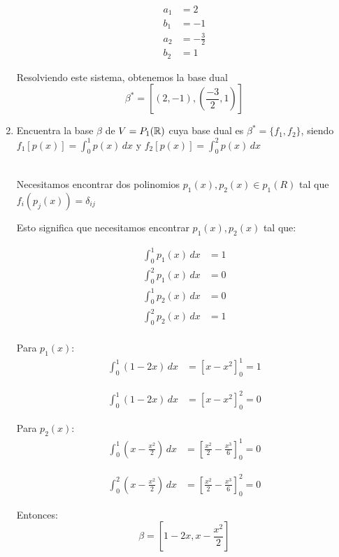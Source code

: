 \begin{enumerate}
    \begin{align*}
        a_{1} & = 2 \\
        b_{1} & = -1 \\ 
        a_{2} & = -\frac{3}{2} \\ 
        b_{2} & = 1
    \end{align*}

    Resolviendo este sistema, obtenemos la base dual 
    \begin{equation*}
        \beta^{*} = \left[ (2,-1), \left( \frac{-3}{2} , 1 \right) \right]
    \end{equation*}

    \item Encuentra la base $\beta$ de $V = P_{1} (\mathbb{R})$ cuya base dual es
          $\beta^{*} = \{ f_{1},f_{2} \}$, siendo 
          $f_{1} \left[ p(x) \right] = \int_{0}^{1} p(x) \, dx$
          y $f_{2} \left[ p(x) \right] = \int_{0}^{2} p(x) \, dx$ 

    \noindent \solucion \\

    Necesitamos encontrar dos polinomios $p_{1}(x), p_{2}(x) \in p_{1}(R)$ tal que 
    $f_{i}(p_{j}(x)) = \delta_{ij}$

    Esto significa que necesitamos encontrar $p_{1}(x),p_{2}(x)$ tal que:

    \begin{align*}
        \int_{0}^{1} p_1(x) \, dx &= 1 \\
        \int_{0}^{2} p_1(x) \, dx &= 0 \\
        \int_{0}^{1} p_2(x) \, dx &= 0 \\
        \int_{0}^{2} p_2(x) \, dx &= 1 \\
    \end{align*}

    Para $p_{1}(x)$:
    \begin{align*}
        \int_{0}^{1} (1 - 2x) \, dx & = \left[ x - x^{2} \right]_{0}^{1} = 1
    \end{align*}

    \begin{align*}
        \int_{0}^{1} (1 - 2x) \, dx & = \left[ x - x^{2} \right]_{0}^{2} = 0
    \end{align*}


    Para $p_{2}(x)$:
    \begin{align*}
        \int_{0}^{1} \left( x - \frac{x^{2}}{2} \right) \, dx & = \left[ \frac{x^{2}}{2} - \frac{x^{3}}{6} \right]_{0}^{1} = 0
    \end{align*}

    \begin{align*}
        \int_{0}^{2} \left( x - \frac{x^{2}}{2} \right) \, dx & = \left[ \frac{x^{2}}{2} - \frac{x^{3}}{6} \right]_{0}^{2} = 0
    \end{align*}



    Entonces:
    \begin{equation*}
        \beta = \left[ 1 - 2x, x - \frac{x^{2}}{2} \right]
    \end{equation*}
\end{enumerate}